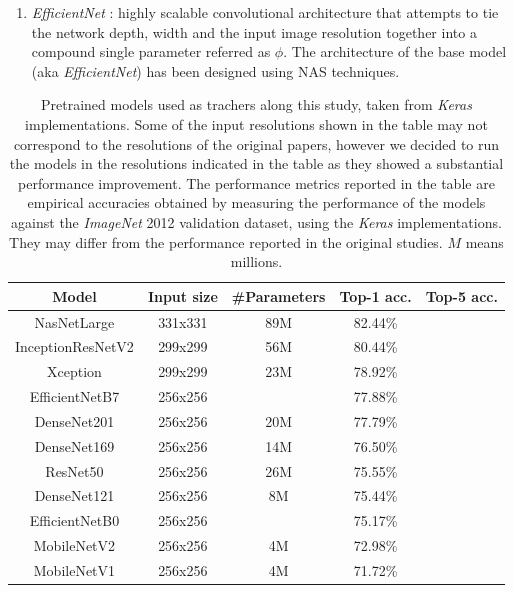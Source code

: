 \documentclass{elsarticle}
\begin{document}
\begin{enumerate}
    	\item \textit{EfficientNet} \cite{tan2019}: highly scalable convolutional architecture that attempts to tie the network depth, width and the input image resolution  together into a compound single parameter referred as $\phi$. The architecture of the base model (aka \textit{EfficientNet}) has been designed using NAS techniques.
    \end{enumerate}
	
	
	\begin{table}[h]
		\small
		\caption{Pretrained models used as trachers along this study, taken from \textit{Keras} implementations. Some of the input resolutions shown in the table may not correspond to the resolutions of the original papers, however we decided to run the models in the resolutions indicated in the table as they showed a substantial performance improvement. The performance metrics reported in the table are empirical accuracies obtained by measuring the performance of the models against the \textit{ImageNet} 2012 validation dataset, using the \textit{Keras} implementations. They may differ from the performance reported in the original studies. $M$ means millions.}
		\centering
	\begin{tabular}{c|cc|cc}
		\toprule
		Model & Input size & \#Parameters & Top-1 acc. & Top-5 acc. \\
		\midrule
		NasNetLarge & 331x331 & 89M & 82.44\% &  \\
		InceptionResNetV2 & 299x299 & 56M & 80.44\% &  \\
		Xception & 299x299 & 23M & 78.92\% &  \\
		EfficientNetB7 & 256x256 &  & 77.88\% &  \\
		DenseNet201 & 256x256 & 20M & 77.79\% &  \\
		DenseNet169 & 256x256 & 14M & 76.50\% &  \\
		ResNet50 & 256x256 & 26M & 75.55\% &  \\
		DenseNet121 & 256x256 & 8M & 75.44\% &  \\
		EfficientNetB0 & 256x256 &  & 75.17\% &  \\
		MobileNetV2 & 256x256 & 4M & 72.98\% &  \\
		MobileNetV1 & 256x256 & 4M & 71.72\% &  \\



		\bottomrule
	\end{tabular}
	\label{table:models}
	\end{table}
	
\end{document}
